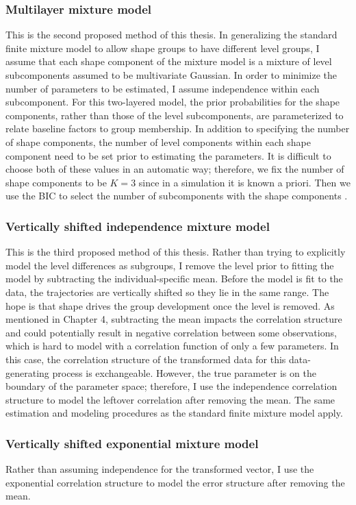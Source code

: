 \subsubsection{Multilayer mixture model}
This is the second proposed method of this thesis. In generalizing the standard finite mixture model to allow shape groups to have different level groups, I assume that each shape component of the mixture model is a mixture of level subcomponents assumed to be multivariate Gaussian. In order to minimize the number of parameters to be estimated, I assume independence within each subcomponent. For this two-layered model, the prior probabilities for the shape components, rather than those of the level subcomponents, are parameterized to relate baseline factors to group membership. In addition to specifying the number of shape components, the number of level components within each shape component need to be set prior to estimating the parameters. It is difficult to choose both of these values in an automatic way; therefore, we fix the number of shape components to be $K=3$ since in a simulation it is known a priori. Then we use the BIC to select the number of subcomponents with the shape components \cite{li2005}. 

\subsubsection{Vertically shifted independence mixture model}
This is the third proposed method of this thesis. Rather than trying to explicitly model the level differences as subgroups, I remove the level prior to fitting the model by subtracting the individual-specific mean. Before the model is fit to the data, the trajectories are vertically shifted so they lie in the same range. The hope is that shape drives the group development once the level is removed. As mentioned in Chapter 4, subtracting the mean impacts the correlation structure and could potentially result in negative correlation between some observations, which is hard to model with a correlation function of only a few parameters. In this case, the correlation structure of the transformed data for this data-generating process is exchangeable. However, the true parameter is on the boundary of the parameter space; therefore, I use the independence correlation structure to model the leftover correlation after removing the mean. The same estimation and modeling procedures as the standard finite mixture model apply.

\subsubsection{Vertically shifted exponential mixture model}
Rather than assuming independence for the transformed vector, I use the exponential correlation structure to model the error structure after removing the mean.

